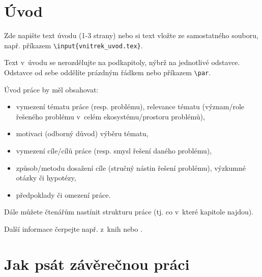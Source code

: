 \documentclass[a4paper,oneside,12pt]{book}
\begin{document}
\newpage  %
\parskip=0pt
\tableofcontents %
\parskip=7pt
\newpage %



\chapter*{Úvod} %
%
Zde napište text úvodu (1-3 strany) nebo si text vložte ze samostatného souboru, např. příkazem \texttt{\textbackslash input\{vnitrek\_uvod.tex\}}.\par Text v~úvodu se nerozdělujte na podkapitoly, nýbrž na jednotlivé odstavce. Odstavce od sebe oddělíte prázdným řádkem nebo příkazem \texttt{\textbackslash par}. \par Úvod práce by měl obsahovat:
\begin{itemize}
    \item vymezení tématu práce (resp. problému), relevance tématu (význam/role řešeného problému v~celém ekosystému/prostoru problémů),
    \item motivaci (odborný důvod) výběru tématu,
    \item vymezení cíle/cílů práce (resp. smysl řešení daného problému),
    \item způsob/metodu dosažení cíle (stručný nástin řešení problému), výzkumné otázky či hypotézy,
    \item předpoklady či omezení práce.
\end{itemize}
Dále můžete čtenářům nastínit strukturu práce (tj. co v~které kapitole najdou). \par
Další informace čerpejte např. z~knih \cite{Kapounova2017} nebo \cite{Mesko2006}.
%



\chapter{Jak psát závěrečnou práci} %
%
\end{document}
